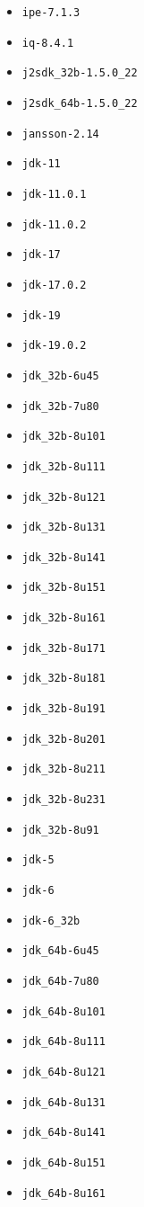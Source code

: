 \begin{multicols}{3}
\begin{itemize}
\item \verb|ipe-7.1.3|
\item \verb|iq-8.4.1|
\item \verb|j2sdk_32b-1.5.0_22|
\item \verb|j2sdk_64b-1.5.0_22|
\item \verb|jansson-2.14|
\item \verb|jdk-11|
\item \verb|jdk-11.0.1|
\item \verb|jdk-11.0.2|
\item \verb|jdk-17|
\item \verb|jdk-17.0.2|
\item \verb|jdk-19|
\item \verb|jdk-19.0.2|
\item \verb|jdk_32b-6u45|
\item \verb|jdk_32b-7u80|
\item \verb|jdk_32b-8u101|
\item \verb|jdk_32b-8u111|
\item \verb|jdk_32b-8u121|
\item \verb|jdk_32b-8u131|
\item \verb|jdk_32b-8u141|
\item \verb|jdk_32b-8u151|
\item \verb|jdk_32b-8u161|
\item \verb|jdk_32b-8u171|
\item \verb|jdk_32b-8u181|
\item \verb|jdk_32b-8u191|
\item \verb|jdk_32b-8u201|
\item \verb|jdk_32b-8u211|
\item \verb|jdk_32b-8u231|
\item \verb|jdk_32b-8u91|
\item \verb|jdk-5|
\item \verb|jdk-6|
\item \verb|jdk-6_32b|
\item \verb|jdk_64b-6u45|
\item \verb|jdk_64b-7u80|
\item \verb|jdk_64b-8u101|
\item \verb|jdk_64b-8u111|
\item \verb|jdk_64b-8u121|
\item \verb|jdk_64b-8u131|
\item \verb|jdk_64b-8u141|
\item \verb|jdk_64b-8u151|
\item \verb|jdk_64b-8u161|

\end{itemize}
\end{multicols}
